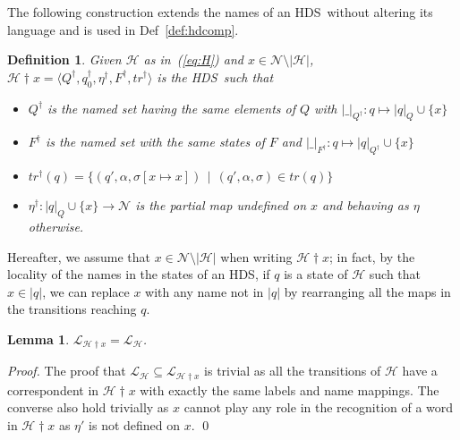 \documentclass[runningheads,a4paper]{llncs}
\newcommand{\longversion}[1]{#1}
\newcommand{\addname}[2]{#1 \dag  #2}
\newcommand{\trans}{\mathit{tr}}
\newcommand{\lang}[1]{\mathcal{L}_{#1}}
\newcommand{\weight}[1]{|#1|}
\newcommand{\st}{\ \ \big| \ \ }
\newcommand{\upd}[2]{[{#1} \mapsto {#2}]}
\newcommand{\hdns}{HDS}
\newcommand{\names}{\mbox{$\mathcal{N}$}}
\newtheorem{definition}{Theorem}[section]
\newtheorem{lemma}{Theorem}[section]
\newtheorem{definition}{Definition}[section]
\newtheorem{lemma}{Lemma}[section]
\newcommand{\tuple}[1]{\langle#1\rangle}
\begin{document}
The following construction extends the names of an \hdns\ without
altering its language and is used in Def~\ref{def:hdcomp}.
\begin{definition}\label{def:hdaddname}
  Given $\mathcal H$ as in~(\ref{eq:H}) and $x \in \names \setminus
  \weight{\mathcal H}$, $\addname{\mathcal H} x =
  \tuple{Q^\dag,q_0^\dag,\eta^\dag,F^\dag,\trans^\dag}$ is the \hdns\
  such that
  \begin{itemize}
  \item $Q^\dag$ is the named set having the same elements of $Q$ with
    $\weight{\_}_{Q^\dag} : q \mapsto \weight{q}_Q \cup \{x\}$
  \item $F^\dag$ is the named set with the same states of $F$ and
    $\weight{\_}_{F^\dag} : q \mapsto \weight{q}_{Q^\dag} \cup \{x\}$
  \item $\trans^\dag(q) = \{(q',\alpha,\sigma\upd x x) \st
    (q',\alpha,\sigma) \in \trans(q)\}$
  \item $\eta^\dag: \weight{q}_Q \cup \{x\} \to \names$ is the partial
    map undefined on $x$ and behaving as $\eta$ otherwise.
  \end{itemize}
\end{definition}
Hereafter, we assume that $x \in \names \setminus \weight{\mathcal H}$
when writing $\addname{\mathcal H} x$; in fact, by the locality of the
names in the states of an \hdns, if $q$ is a state of $\mathcal H$
such that $x \in \weight q$, we can replace $x$ with any name not in
$\weight q$ by rearranging all the maps in the transitions reaching
$q$.
\begin{lemma}\label{prop:hdaddname}
  $\lang{\addname{\mathcal H} x} = \lang{\mathcal H}$.
\end{lemma}
\longversion{
\begin{proof}
  The proof that $\lang{\mathcal H} \subseteq \lang{\addname{\mathcal
      H} x}$ is trivial as all the transitions of $\mathcal H$ have a
  correspondent in $\addname{\mathcal H} x$ with exactly the same labels
  and name mappings.
The converse also hold trivially as $x$ cannot play any role in the
  recognition of a word in $\addname{\mathcal H} x$ as $\eta'$ is not
  defined on $x$.
  \qed
\end{proof}
}
\end{document}
